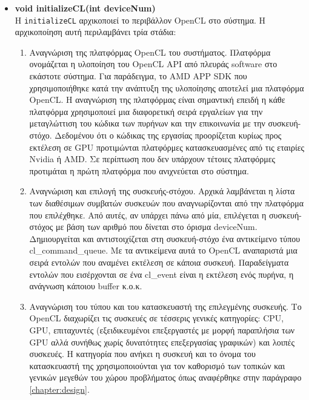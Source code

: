 \begin{itemize}

\item \textbf{void initializeCL(int deviceNum)}\\ 
H \verb!initializeCL! αρχικοποιεί το περιβάλλον OpenCL στο σύστημα. Η αρχικοποίηση αυτή περιλαμβάνει τρία στάδια: 

\begin{enumerate}
\item Αναγνώριση της πλατφόρμας OpenCL του συστήματος. Πλατφόρμα ονομάζεται η υλοποίηση του OpenCL API από πλευράς software στο εκάστοτε σύστημα. Για παράδειγμα, το AMD APP SDK που χρησιμοποιήθηκε κατά την ανάπτυξη της υλοποίησης αποτελεί μια πλατφόρμα OpenCL. Η αναγνώριση της πλατφόρμας είναι σημαντική επειδή η κάθε πλατφόρμα χρησιμοποιεί μια διαφορετική σειρά εργαλείων για την μεταγλώττιση του κώδικα των πυρήνων και την επικοινωνία με την συσκευή-στόχο. Δεδομένου ότι ο κώδικας της εργασίας προορίζεται κυρίως προς εκτέλεση σε GPU προτιμώνται πλατφόρμες κατασκευασμένες από τις εταιρίες Nvidia ή AMD. Σε περίπτωση που δεν υπάρχουν τέτοιες πλατφόρμες προτιμάται η πρώτη πλατφόρμα που ανιχνεύεται στο σύστημα. 
\item Αναγνώριση και επιλογή της συσκευής-στόχου. Αρχικά λαμβάνεται η λίστα των διαθέσιμων συμβατών συσκευών που αναγνωρίζονται από την πλατφόρμα που επιλέχθηκε. Από αυτές, αν υπάρχει πάνω από μία, επιλέγεται η  συσκευή-στόχος με βάση των αριθμό που δίνεται στο όρισμα deviceNum. Δημιουργείται και αντιστοιχίζεται στη συσκευή-στόχο ένα αντικείμενο τύπου        cl\_command\_queue. Με τα αντικείμενα αυτά το OpenCL αναπαριστά μια σειρά εντολών που αναμένει εκτέλεση σε κάποια συσκευή. Παραδείγματα εντολών που εισέρχονται σε ένα cl\_event είναι η εκτέλεση ενός πυρήνα, η ανάγνωση κάποιου buffer κ.ο.κ.
\item Αναγνώριση του τύπου και του κατασκευαστή της επιλεγμένης συσκευής. Το OpenCL διαχωρίζει τις συσκευές σε τέσσερις γενικές κατηγορίες: CPU, GPU,  επιταχυντές (εξειδικευμένοι επεξεργαστές με μορφή παραπλήσια των GPU αλλά συνήθως χωρίς δυνατότητες επεξεργασίας γραφικών) και λοιπές συσκευές.  Η κατηγορία που ανήκει η συσκευή και το όνομα του κατασκευαστή της χρησιμοποιούνται για τον καθορισμό των τοπικών και γενικών μεγεθών του χώρου προβλήματος όπως αναφέρθηκε στην παράγραφο \ref{chapter:design}. 
\end{enumerate}


\end{itemize}
